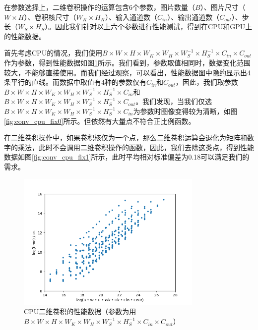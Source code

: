     在参数选择上，二维卷积操作的运算包含6个参数，图片数量（$ B $）、图片尺寸（$ W \times H $）、卷积核尺寸（$ W_K \times H_K $）、输入通道数（$ C_{in} $）、输出通道数（$ C_{out} $）、步长（$ W_S \times H_S $）。因此我们针对以上六个参数进行性能测试，得到在CPU和GPU上的性能数据。

    首先考虑CPU的情况，我们使用$ B \times W \times H \times W_K \times W_H \times W_S^{-1} \times H_S^{-1} \times C_{in} \times C_{out} $作为参数，得到性能数据如图\ref{fig:conv_cpu}所示。我们看到，参数取值相同时，数据变化范围较大，不能够直接使用。而我们经过观察，可以看出，性能数据图中隐约显示出4条平行的直线。而数据中取值有4种的参数仅有$ C_{in} $和$ C_{out} $，因此，我们取参数$ B \times W \times H \times W_K \times W_H \times W_S^{-1} \times H_S^{-1} \times C_{in} $和$ B \times W \times H \times W_K \times W_H \times W_S^{-1} \times H_S^{-1} \times C_{out} $。我们发现，当我们仅选$ B \times W \times H \times W_K \times W_H \times W_S^{-1} \times H_S^{-1} \times C_{in}  $为参数时图像变得较为清晰，如图\ref{fig:conv_cpu_fix0}所示。但依然有大量点不符合正比例函数。
    
    在二维卷积操作中，如果卷积核仅为一个点，那么二维卷积运算会退化为矩阵和数字的乘法，此时不会调用二维卷积操作的函数，因此，我们去除这类点，得到性能数据如图\ref{fig:conv_cpu_fix1}所示，此时平均相对标准偏差为0.18可以满足我们的需求。

    \begin{figure}[!htbp]
        \centering
        \includegraphics[width=0.8\textwidth]{figures/conv_cpu.png}
        \caption{CPU二维卷积的性能数据（参数为用$ B \times W \times H \times W_K \times W_H \times W_S^{-1} \times H_S^{-1} \times C_{in} \times C_{out} $）}
        \label{fig:conv_cpu}
    \end{figure}

